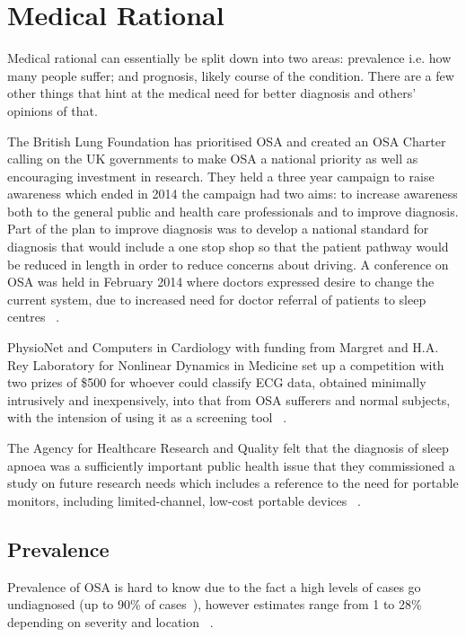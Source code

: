 \section{Medical Rational}
\label{sec:medicalneed-sophie}
Medical rational can essentially be split down into two areas: prevalence i.e. how many people suffer; and prognosis, likely course of the condition. There are a few other things that hint at the medical need for better diagnosis and others’ opinions of that. 

The British Lung Foundation has prioritised OSA and created an OSA Charter calling on the UK governments to make OSA a national priority as well as encouraging investment in research. They held a three year campaign to raise awareness which ended in 2014 the campaign had two aims: to increase awareness both to the general public and health care professionals and to improve diagnosis. Part of the plan to improve diagnosis was to develop a national standard for diagnosis that would include a one stop shop so that the patient pathway would be reduced in length in order to reduce concerns about driving. A conference on OSA was held in February 2014 where doctors expressed desire to change the current system, due to increased need for doctor referral of patients to sleep centres ~\cite{britishlungfoundation}.

PhysioNet and Computers in Cardiology with funding from Margret and H.A. Rey Laboratory for Nonlinear Dynamics in Medicine set up a competition with two prizes of \$500 for whoever could classify ECG data, obtained minimally intrusively and inexpensively, into that from OSA sufferers and normal subjects, with the intension of using it as a screening tool ~\cite{physionet}.

The Agency for Healthcare Research and Quality felt that the diagnosis of sleep apnoea was a sufficiently important public health issue that they commissioned a study on future research needs which includes a reference to the need for portable monitors, including limited-channel, low-cost portable devices ~\cite{balk2012future}.

\subsection{Prevalence}
Prevalence of OSA is hard to know due to the fact a high levels of cases go undiagnosed (up to 90\% of cases~\cite{finkel2009prevalence}), however estimates range from 1 to 28\% depending on severity and location ~\cite{young2002epidemiology}.

